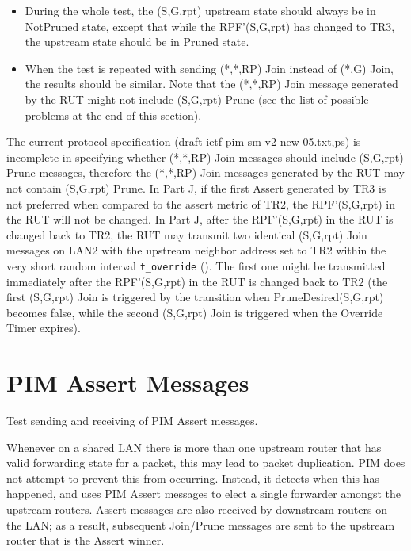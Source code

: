\documentclass[11pt]{report}
\begin{document}
\begin{itemize}
  \item During the whole test, the (S,G,rpt) upstream state should always be
  in NotPruned state, except that while the RPF'(S,G,rpt) has changed to TR3,
  the upstream state should be in Pruned state.

  \item When the test is repeated with sending (*,*,RP) Join instead of (*,G)
  Join, the results should be similar.
  Note that the (*,*,RP) Join message generated by the RUT might not include
  (S,G,rpt) Prune (see the list of possible problems at the end of this
  section).

\end{itemize}

The current protocol specification (draft-ietf-pim-sm-v2-new-05.{txt,ps}) is
incomplete in 
specifying whether (*,*,RP) Join messages should include (S,G,rpt) Prune
messages, therefore the (*,*,RP) Join messages generated by the RUT may not
contain (S,G,rpt) Prune.
In Part J, if the first Assert generated by TR3 is not preferred when compared
to the assert metric of TR2, the RPF'(S,G,rpt) in the RUT will not be changed.
In Part J, after the RPF'(S,G,rpt) in the RUT is changed back to TR2, the RUT
may transmit two identical (S,G,rpt) Join messages on LAN2 with the upstream
neighbor address set to TR2 within the very short random interval
\verb=t_override= ({\PimsmTOverride}). The first one might be transmitted
immediately after the RPF'(S,G,rpt) in the RUT is changed back to TR2 (the
first (S,G,rpt) Join is triggered by the transition when PruneDesired(S,G,rpt)
becomes false, while the second (S,G,rpt) Join is triggered when the Override
Timer expires).



\chapter{PIM Assert Messages}

Test sending and receiving of PIM Assert messages.

Whenever on a shared LAN there is more than one upstream router that has valid
forwarding state for a packet, this may lead to packet duplication.
PIM does not attempt to prevent this from occurring. Instead, it detects when
this has happened, and uses PIM Assert messages to elect a single forwarder
amongst the upstream routers. Assert messages are also received by downstream
routers on the LAN; as a result, subsequent Join/Prune messages are sent to
the upstream router that is the Assert winner.
\end{document}
